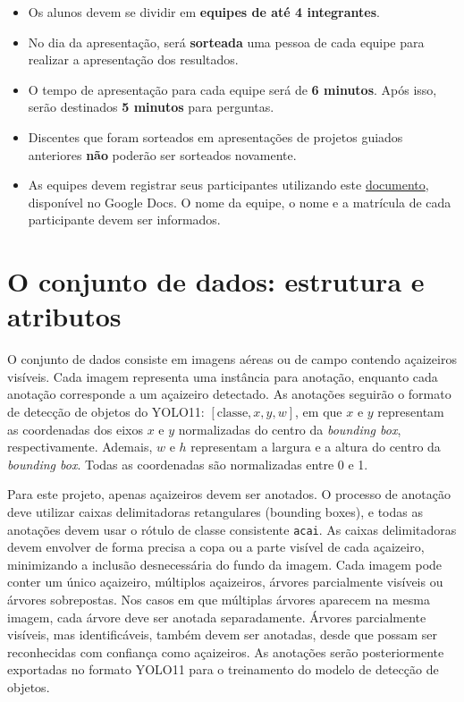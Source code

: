 \documentclass[a4paper,12pt]{article}
\begin{document}
\begin{itemize}
    \item Os alunos devem se dividir em \textbf{equipes de até 4 integrantes}.
    \item No dia da apresentação, será \textbf{sorteada} uma pessoa de cada equipe para realizar a apresentação dos resultados.
    \item O tempo de apresentação para cada equipe será de \textbf{6 minutos}. Após isso, serão destinados \textbf{5 minutos} para perguntas.
    \item Discentes que foram sorteados em apresentações de projetos guiados anteriores \textbf{não} poderão ser sorteados novamente.
    \item As equipes devem registrar seus participantes utilizando este \href{https://docs.google.com/document/d/15P5LS1acOYfKUvpTr-5hR2llA2ImzHxtAgWnj2U04hg/edit?usp=sharing}{documento}, disponível no Google Docs. O nome da equipe, o nome e a matrícula de cada participante devem ser informados.
\end{itemize}


\section{O conjunto de dados: estrutura e atributos}
O conjunto de dados consiste em imagens aéreas ou de campo contendo açaizeiros visíveis. Cada imagem representa uma instância para anotação, enquanto cada anotação corresponde a um açaizeiro detectado. As anotações seguirão o formato de detecção de objetos do YOLO11: $[\text{classe}, x, y, w]$, em que $x$ e $y$ representam as coordenadas dos eixos $x$ e $y$ normalizadas do centro da \textit{bounding box}, respectivamente. Ademais, $w$ e $h$ representam a largura e a altura do centro da \textit{bounding box}. Todas as coordenadas são normalizadas entre 0 e 1.

Para este projeto, apenas açaizeiros devem ser anotados. O processo de anotação deve utilizar caixas delimitadoras retangulares (bounding boxes), e todas as anotações devem usar o rótulo de classe consistente \texttt{acai}. As caixas delimitadoras devem envolver de forma precisa a copa ou a parte visível de cada açaizeiro, minimizando a inclusão desnecessária do fundo da imagem. Cada imagem pode conter um único açaizeiro, múltiplos açaizeiros, árvores parcialmente visíveis ou árvores sobrepostas. Nos casos em que múltiplas árvores aparecem na mesma imagem, cada árvore deve ser anotada separadamente. Árvores parcialmente visíveis, mas identificáveis, também devem ser anotadas, desde que possam ser reconhecidas com confiança como açaizeiros. As anotações serão posteriormente exportadas no formato YOLO11 para o treinamento do modelo de detecção de objetos.
\end{document}
